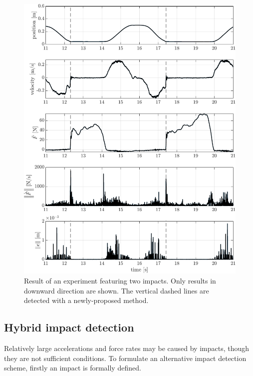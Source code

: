 \documentclass[11pt]{report}
\numberwithin{equation}{section}        %
\numberwithin{figure}{section}          %
\numberwithin{table}{section}           %
\begin{document}
  \begin{figure}[]
  \centering
  \begin{adjustwidth}{0pt}{5pt}
  \includegraphics[right]{Graphics/force_VS_pos_impacts.pdf}
  \end{adjustwidth}
  \caption{Result of an experiment featuring two impacts. Only results in downward direction are shown. The vertical dashed lines are detected with a newly-proposed method.}
  \label{fig:force_pos_detection}
  \end{figure}
\newpage
  \subsection{Hybrid impact detection}
  Relatively large accelerations and force rates may be caused by impacts, though they are not sufficient conditions. To formulate an alternative impact detection scheme, firstly an impact is formally defined.
\end{document}
